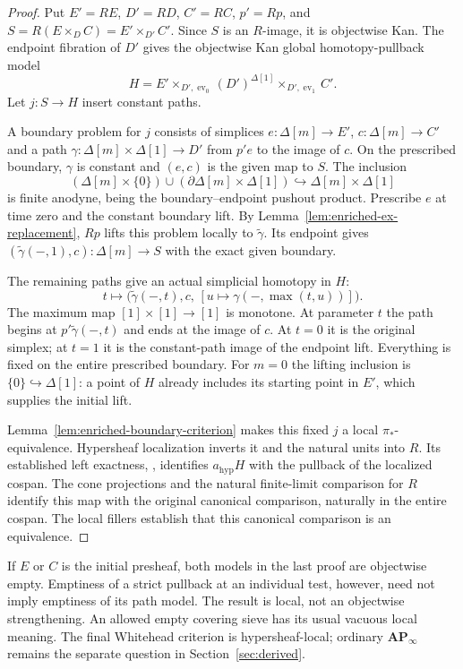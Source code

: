 \documentclass[12pt]{amsart}
\theoremstyle{definition}
\theoremstyle{remark}
\numberwithin{equation}{section}
\DeclareMathOperator{\ev}{ev}
\begin{document}
\begin{proof}
Put $E'=RE$, $D'=RD$, $C'=RC$, $p'=Rp$, and
$S=R(E\times_D C)=E'\times_{D'}C'$.
Since $S$ is an $R$-image, it is objectwise Kan.
The endpoint fibration of $D'$ gives
the objectwise Kan global homotopy-pullback model
\[
 H=E'\times_{D',\ev_0}(D')^{\Delta[1]}
                         \times_{D',\ev_1}C'.
\]
Let $j:S\to H$ insert constant paths.

A boundary problem for $j$ consists of simplices
$e:\Delta[m]\to E'$, $c:\Delta[m]\to C'$ and
a path $\gamma:\Delta[m]\times\Delta[1]\to D'$
from $p'e$ to the image of $c$. On the prescribed
boundary, $\gamma$ is constant and $(e,c)$ is the
given map to $S$. The inclusion
\[
 (\Delta[m]\times\{0\})
 \cup(\partial\Delta[m]\times\Delta[1])
 \hookrightarrow\Delta[m]\times\Delta[1]
\]
is finite anodyne, being the boundary--endpoint
pushout product. Prescribe $e$ at time zero and the
constant boundary lift. By
Lemma~\ref{lem:enriched-ex-replacement}, $Rp$ lifts
this problem locally to $\widetilde\gamma$.
Its endpoint gives
$(\widetilde\gamma(-,1),c):\Delta[m]\to S$
with the exact given boundary.

The remaining paths give an actual simplicial
homotopy in $H$:
\[
 t\longmapsto
 \bigl(\widetilde\gamma(-,t),c,\,
           [u\mapsto\gamma(-,\max(t,u))]\bigr).
\]
The maximum map $[1]\times[1]\to[1]$ is monotone.
At parameter $t$ the path begins at
$p'\widetilde\gamma(-,t)$ and ends at the image of
$c$. At $t=0$ it is the original simplex; at $t=1$
it is the constant-path image of the endpoint lift.
Everything is fixed on the entire prescribed boundary.
For $m=0$ the lifting inclusion is
$\{0\}\hookrightarrow\Delta[1]$: a point of $H$
already includes its starting point in $E'$, which
supplies the initial lift.

Lemma~\ref{lem:enriched-boundary-criterion} makes
this fixed $j$ a local $\pi_*$-equivalence.
Hypersheaf localization inverts it and the natural
units into $R$. Its established left exactness,
\cite[Proposition~3.4.10, PDF leaf~34]{HAGI2005},
identifies $a_{\mathrm{hyp}}H$ with the pullback
of the localized cospan. The cone projections and
the natural finite-limit comparison for $R$ identify
this map with the original canonical comparison,
naturally in the entire cospan. The local fillers
establish that this canonical comparison is an
equivalence.
\end{proof}

If $E$ or $C$ is the initial presheaf, both models in
the last proof are objectwise empty. Emptiness of a
strict pullback at an individual test, however, need
not imply emptiness of its path model. The result is
local, not an objectwise strengthening. An allowed
empty covering sieve has its usual vacuous local
meaning. The final Whitehead criterion is
hypersheaf-local; ordinary $\mathbf{AP}_\infty$
remains the separate question in
Section~\ref{sec:derived}.
\end{document}
